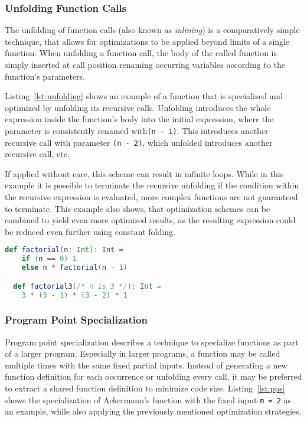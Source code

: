 \subsubsection*{Unfolding Function Calls}

The unfolding of function calls (also known as \textit{inlining}) is a comparatively simple technique, that allows for optimizations to be applied beyond limits of a single function.
When unfolding a function call, the body of the called function is simply inserted at call position renaming occurring variables according to the function's parameters.

Listing~\ref{lst:unfolding} shows an example of a function that is specialized and optimized by unfolding its recursive calls.
Unfolding introduces the whole expression inside the function's body into the initial expression, where the parameter is consistently renamed with\linebreak \texttt{(n - 1)}.
This introduces another recursive call with parameter \texttt{(n - 2)}, which unfolded introduces another recursive call, etc.

If applied without care, this scheme can result in infinite loops.
While in this example it is possible to terminate the recursive unfolding if the condition within the recursive expression is evaluated, more complex functions are not guaranteed to terminate.
This example also shows, that optimization schemes can be combined to yield even more optimized results, as the resulting expression could be reduced even further using constant folding.

\newpage

\begin{lstlisting}[language=scala,caption={Definition of the \texttt{factorial} function and its specialization.},label={lst:unfolding}]
  def factorial(n: Int): Int =
    if (n == 0) 1
    else n * factorial(n - 1)

  def factorial3(/* n is 3 */): Int =
    3 * (3 - 1) * (3 - 2) * 1
\end{lstlisting}


\subsubsection*{Program Point Specialization}

Program point specialization describes a technique to specialize functions as part of a larger program.
Especially in larger programs, a function may be called multiple times with the same fixed partial inputs.
Instead of generating a new function definition for each occurrence or unfolding every call, it may be preferred to extract a shared function definition to minimize code size.
Listing~\ref{lst:pps} shows the specialization of Ackermann's function with the fixed input \texttt{m = 2} as an example, while also applying the previously mentioned optimization strategies.

